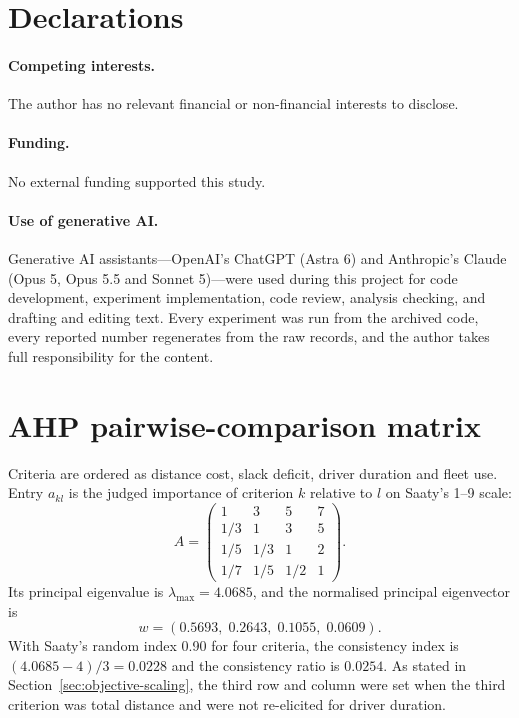 \documentclass[11pt,a4paper]{article}
\begin{document}
\section*{Declarations}

\paragraph{Competing interests.} The author has no relevant financial or non-financial interests to disclose.

\paragraph{Funding.} No external funding supported this study.

\paragraph{Use of generative AI.} Generative AI assistants---OpenAI's
ChatGPT (Astra 6) and Anthropic's Claude (Opus 5, Opus 5.5 and Sonnet 5)---were
used during
this project for code development, experiment implementation, code review,
analysis checking, and drafting and editing text. Every experiment was run from the archived code, every reported number
regenerates from the raw records, and the author takes full responsibility
for the content.

\clearpage
\appendix
\section{AHP pairwise-comparison matrix}\label{sec:ahp-matrix}

Criteria are ordered as distance cost, slack deficit, driver duration and fleet
use. Entry $a_{kl}$ is the judged importance of criterion $k$ relative to $l$
on Saaty's 1--9 scale:
\[
A=\begin{pmatrix}
1 & 3 & 5 & 7\\
1/3 & 1 & 3 & 5\\
1/5 & 1/3 & 1 & 2\\
1/7 & 1/5 & 1/2 & 1
\end{pmatrix}.
\]
Its principal eigenvalue is $\lambda_{\max}=4.0685$, and the normalised
principal eigenvector is
\[
w=(0.5693,\;0.2643,\;0.1055,\;0.0609).
\]
With Saaty's random index 0.90 for four criteria, the consistency index is
$(4.0685-4)/3=0.0228$ and the consistency ratio is $0.0254$. As stated in Section~\ref{sec:objective-scaling},
the third row and column were set when the third criterion was total distance
and were not re-elicited for driver duration.
\end{document}
